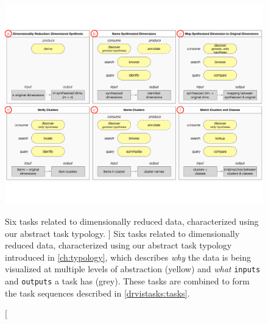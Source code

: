 \begin{figure}
	\centering
	\includegraphics[width=\textwidth]{figures/drviztasks.pdf}
	\caption
	[
	    Six tasks related to dimensionally reduced data, characterized using our abstract task typology.
	]
	{
	    Six tasks related to dimensionally reduced data, characterized using our abstract task typology introduced in \autoref{ch:typology}, which describes \textsl{why} the data is being visualized at multiple levels of abstraction (yellow) and \textsl{what} {\tt inputs} and {\tt outputs} a task has (grey). These tasks are combined to form the task sequences described in \autoref{drvistasks:tasks}.
	}
	\centering
	\label{drvistasks:fig:drviztasks}
\end{figure}


